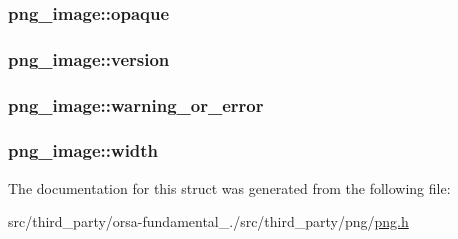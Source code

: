\subsubsection[{opaque}]{ png\+\_\+image\+::opaque}\label{structpng__image_a7b502596648744e2ee0c8788e2c6e918}
\hypertarget{structpng__image_a8c276ba2922051ff0ff9175ab1e23ed1}{}
\subsubsection[{version}]{ png\+\_\+image\+::version}\label{structpng__image_a8c276ba2922051ff0ff9175ab1e23ed1}
\hypertarget{structpng__image_a1b6e296964e81414b0a1cf232ffbcfce}{}
\subsubsection[{warning\+\_\+or\+\_\+error}]{ png\+\_\+image\+::warning\+\_\+or\+\_\+error}\label{structpng__image_a1b6e296964e81414b0a1cf232ffbcfce}
\hypertarget{structpng__image_a72ec07853c82c632c2d7b3c68c62b659}{}
\subsubsection[{width}]{ png\+\_\+image\+::width}\label{structpng__image_a72ec07853c82c632c2d7b3c68c62b659}


The documentation for this struct was generated from the following file\+:\begin{DoxyCompactItemize}
\item 
src/third\+\_\+party/orsa-\/fundamental\+\_./src/third\+\_\+party/png/\hyperlink{png_8h}{png.\+h}\end{DoxyCompactItemize}
